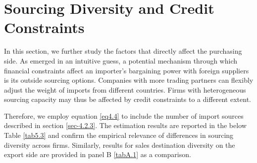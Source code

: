 \section{Sourcing Diversity and Credit Constraints}

In this section, we further study the factors that directly affect the purchasing side. As emerged in an intuitive guess, a potential mechanism through which financial constraints affect an importer's bargaining power with foreign suppliers is its outside sourcing options. Companies with more trading partners can flexibly adjust the weight of imports from different countries. Firms with heterogeneous sourcing capacity may thus be affected by credit constraints to a different extent. 

Therefore, we employ equation \ref{eq4.4} to include the number of import sources described in section \ref{sec-4.2.3}. The estimation results are reported in the below Table \ref{tab5.3} and confirm the empirical relevance of differences in sourcing diversity across firms. Similarly, results for sales destination diversity on the export side are provided in panel B \ref{tabA.1} as a comparison.

